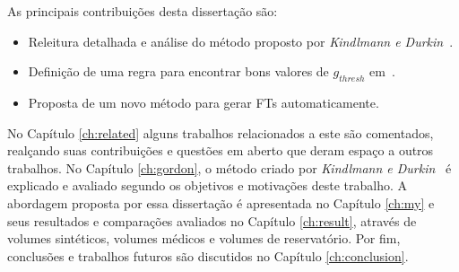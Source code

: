     As principais contribuições desta dissertação são:
\begin{itemize}
   	\item Releitura detalhada e análise do método proposto por \textit{Kindlmann e Durkin}~\cite{gordon}.
   	\item Definição de uma regra para encontrar bons valores de $ g_{thresh} $ em~\cite{gordon}.
   	\item Proposta de um novo método para gerar FTs automaticamente.
\end{itemize}

    No Capítulo \ref{ch:related} alguns trabalhos relacionados a este são comentados, realçando suas contribuições e questões em aberto que deram espaço a outros trabalhos. No Capítulo \ref{ch:gordon}, o método criado por \textit{Kindlmann e Durkin}~\cite{gordon} é explicado e avaliado segundo os objetivos e motivações deste trabalho. A abordagem proposta por essa dissertação é apresentada no Capítulo \ref{ch:my} e seus resultados e comparações avaliados no Capítulo \ref{ch:result}, através de volumes sintéticos, volumes médicos e volumes de reservatório. Por fim, conclusões e trabalhos futuros são discutidos no Capítulo \ref{ch:conclusion}.